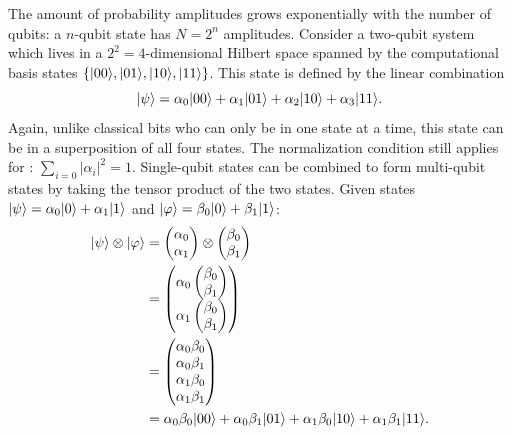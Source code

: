 The amount of probability amplitudes grows exponentially with the number of qubits: a $n$-qubit state has $N = 2^n$ amplitudes.
Consider a two-qubit system which lives in a $2^2=4$-dimensional Hilbert space spanned by the computational basis states $\left\{\vert{00}\rangle, \vert{01}\rangle, \vert{10}\rangle, \vert{11}\rangle\right\}$.
This state is defined by the linear combination
\begin{equation} \label{eqn:two-qubit-state}
\vert{\psi}\rangle = \alpha_0\vert{00}\rangle + \alpha_1\vert{01}\rangle + \alpha_2\vert{10}\rangle + \alpha_3\vert{11}\rangle.
\end{equation}
Again, unlike classical bits who can only be in one state at a time, this state can be in a superposition of all four states.
The normalization condition still applies for : $\sum_{i=0}|\alpha_i|^2 = 1$.
Single-qubit states can be combined to form multi-qubit states by taking the tensor product of the two states.
Given states $\vert{\psi}\rangle = \alpha_0\vert{0}\rangle + \alpha_1\vert{1}\rangle$ and $\vert{\varphi}\rangle = \beta_0\vert{0}\rangle + \beta_1\vert{1}\rangle$:
\begin{equation} \label{eqn:tensor-product-states}
\begin{aligned}
\vert{\psi}\rangle \otimes \vert{\varphi}\rangle &= \begin{pmatrix}\alpha_0 \\ \alpha_1\end{pmatrix} \otimes \begin{pmatrix}\beta_0 \\ \beta_1\end{pmatrix} \\
&= \begin{pmatrix}\alpha_0\begin{pmatrix}\beta_0 \\ \beta_1\end{pmatrix} \\ \alpha_1\begin{pmatrix}\beta_0 \\ \beta_1\end{pmatrix}\end{pmatrix} \\
&= \begin{pmatrix}\alpha_0\beta_0 \\ \alpha_0\beta_1 \\ \alpha_1\beta_0 \\ \alpha_1\beta_1\end{pmatrix} \\
&= \alpha_0\beta_0\vert{00}\rangle + \alpha_0\beta_1\vert{01}\rangle + \alpha_1\beta_0\vert{10}\rangle + \alpha_1\beta_1\vert{11}\rangle.
\end{aligned}
\end{equation}
